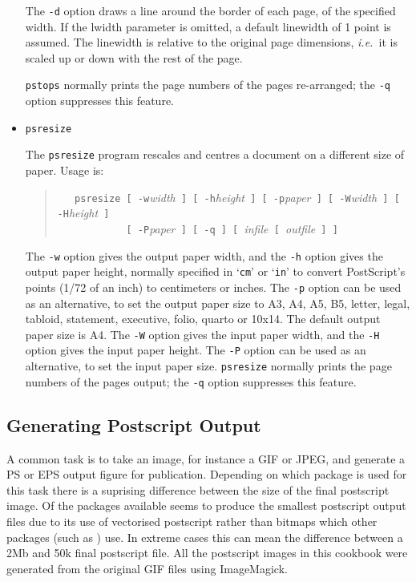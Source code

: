\documentclass[twoside,11pt]{starlink}
\begin{document}
\begin{itemize}
The \texttt{-d} option draws a line around the border of each page, of
the specified width. If the lwidth parameter is omitted, a default
linewidth of 1 point is assumed. The linewidth is relative to the
original page dimensions, \emph{i.e.\ }it is scaled up or down with the
rest of the page.

\texttt{pstops} normally prints the page numbers of the pages
re-arranged; the \texttt{-q} option suppresses this feature.

\item \texttt{psresize}

The \texttt{psresize} program rescales and centres a document on a
different size of paper. Usage is:

\begin{quote}
\verb+   psresize [ -w+\emph{width}\verb+ ] [ -h+\emph{height}\verb+ ] [ -p+\emph{paper}\verb+ ] [ -W+\emph{width}\verb+ ] [ -H+\emph{height}\verb+ ]+\\
\verb+            [ -P+\emph{paper}\verb+ ] [ -q ] [ +\emph{infile}\verb+ [ +\emph{outfile}\verb+ ] ]+
\end{quote}

The \texttt{-w} option gives the output paper width, and the \texttt{-h}
option gives the output paper height, normally specified in `\texttt{cm}'
or `\texttt{in}' to convert PostScript's points (1/72 of an inch) to
centimeters or inches. The \texttt{-p} option can be used as an
alternative, to set the output paper size to A3, A4, A5, B5, letter,
legal, tabloid, statement, executive, folio, quarto or 10x14. The
default output paper size is A4. The \texttt{-W} option gives the input
paper width, and the \texttt{-H} option gives the input paper height. The
\texttt{-P} option can be used as an alternative, to set the input paper
size. \texttt{psresize} normally prints the page numbers of the pages
output; the {\tt-q} option suppresses this feature.

\end{itemize}

\subsection{Generating Postscript Output\label{sc15_ps_generation}}

A common task is to take an image, for instance a GIF or JPEG, and
generate a PS or EPS output figure for publication. Depending on which
package is used for this task there is a suprising difference between
the size of the final postscript image. Of the packages available
 seems to produce the smallest
postscript output files due to its use of vectorised postscript rather
than bitmaps which other packages (such as ) use. In extreme cases this can mean the difference
between a 2Mb and 50k final postscript file. All the postscript images
in this cookbook were generated from the original GIF files using
ImageMagick.
\end{document}
